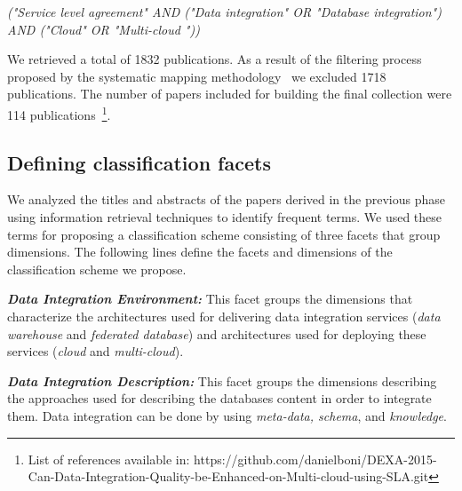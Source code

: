 \begin{center}
\textit{("Service level agreement"  AND ("Data integration" OR "Database
integration") AND ("Cloud" OR "Multi-cloud "))} \\
\end{center}
\medskip  

We retrieved  a total of 1832 publications. As a result of the filtering process
proposed by the systematic mapping methodology~\cite{SM:Petersen:2008} we excluded 1718 publications.
The number of papers included for building the final collection were 114
publications~\footnote{List of references available in:
https://github.com/danielboni/DEXA-2015-Can-Data-Integration-Quality-be-Enhanced-on-Multi-cloud-using-SLA.git}.

\subsection{Defining classification facets}

We analyzed the titles and abstracts of the  papers derived in the previous
phase using information retrieval techniques  to identify  frequent
 terms. We used these terms for proposing a classification scheme
consisting of three facets that group dimensions. The following lines define the facets and dimensions of the
classification scheme we propose. 

\textbf{\textit{Data Integration Environment:}}  
This facet groups the dimensions that characterize the architectures used for delivering data integration services ({\em data warehouse} and  {\em federated database}) and  architectures used for deploying these services ({\em cloud} and {\em multi-cloud}).

\textbf{\textit{Data Integration Description:}}
 This facet groups the dimensions describing the approaches used for describing the databases content in order to  integrate them. Data integration can be done by using {\em meta-data, schema}, and {\em knowledge}.

